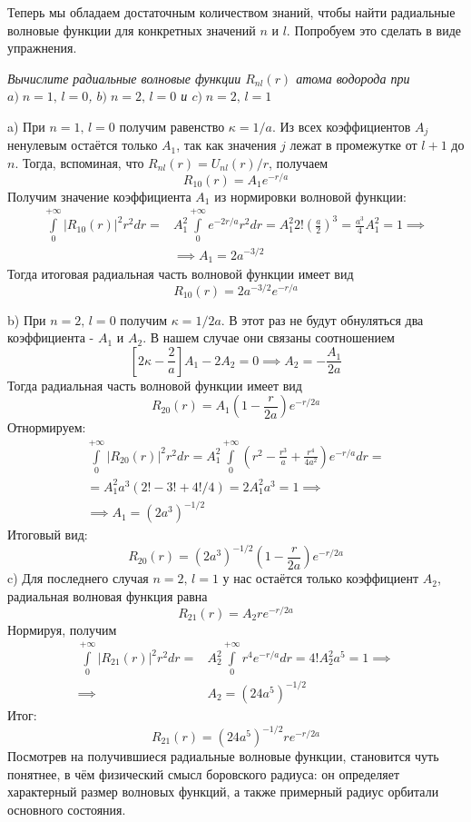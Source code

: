 Теперь мы обладаем достаточным количеством знаний, чтобы найти радиальные волновые функции для конкретных значений $n$ и $l$. Попробуем это сделать в виде упражнения.
\newpage
{}
\begin{center}
    \textit{Вычислите радиальные волновые функции $R_{nl}(r)$ атома водорода при $ a)\;n = 1,\, l =0$, $b)\;n = 2,\, l =0$ и $c)\;n = 2,\, l =1$}
\end{center}

a)  При $n = 1,\, l=0$ получим равенство $\kappa = 1/a$. Из всех коэффициентов $A_j$ ненулевым остаётся только $A_1$, так как значения $j$ лежат в промежутке от $l+1$ до $n$. Тогда, вспоминая, что $R_{nl}(r) = U_{nl}(r)/r$, получаем
\[
R_{10}(r) = A_1e^{-r/a}
\]
Получим значение коэффициента $A_1$ из нормировки волновой функции:
\begin{align*}
\int\limits_0^{+\infty}|R_{10}(r)|^2 r^2 dr = & A^2_1\int\limits_0^{+\infty}e^{-2r/a}r^2 dr = A^2_1 2!(\frac{a}{2})^3 = \frac{a^3}{4}A^2_1 = 1 \implies \\ 
&\implies A_1 = 2a^{-3/2}
\end{align*}
Тогда итоговая радиальная часть волновой функции имеет вид
\[
R_{10}(r) = 2a^{-3/2}e^{-r/a}
\]

b) При $n = 2,\, l=0$ получим $\kappa = 1/2a$. В этот раз не будут обнуляться два коэффициента - $A_1$ и $A_2$. В нашем случае они связаны соотношением
\[
\left[ 2\kappa - \frac{2}{a} \right]A_1 - 2A_2 = 0 \implies A_2 = -\frac{A_1}{2a}
\]
Тогда радиальная часть волновой функции имеет вид
\[
R_{20}(r) = A_1\left( 1 - \frac{r}{2a} \right) e^{-r/2a}
\]
Отнормируем:
\begin{gather*}
\int\limits_0^{+\infty}|R_{20}(r)|^2 r^2 dr = A^2_1\int\limits_0^{+\infty}\left( r^2 - \frac{r^3}{a} +\frac{r^4}{4a^2} \right)e^{-r/a} dr = \\ 
= A^2_1 a^3 (2! - 3! + 4!/4) = 2A^2_1 a^3 = 1 \implies \\ 
\implies A_1 = (2a^3)^{-1/2}
\end{gather*}
Итоговый вид:
\[
R_{20}(r) = (2a^3)^{-1/2}\left( 1 - \frac{r}{2a} \right) e^{-r/2a}
\]
c) Для последнего случая $n=2,\, l=1$ у нас остаётся только коэффициент $A_2$, радиальная волновая функция равна
\[
R_{21}(r) = A_2re^{-r/2a}
\]
Нормируя, получим
\begin{align*}    
\int\limits_0^{+\infty}|R_{21}(r)|^2 r^2 dr = & A^2_2\int\limits_0^{+\infty}r^4 e^{-r/a} dr = 4! A^2_2 a^5 = 1 \implies \\ \implies & A_2 = (24a^5)^{-1/2}
\end{align*}
Итог:
\[
R_{21}(r) = (24a^5)^{-1/2}re^{-r/2a}
\]
Посмотрев на получившиеся радиальные волновые функции, становится чуть понятнее, в чём физический смысл боровского радиуса: он определяет характерный размер волновых функций, а также примерный радиус орбитали основного состояния.

